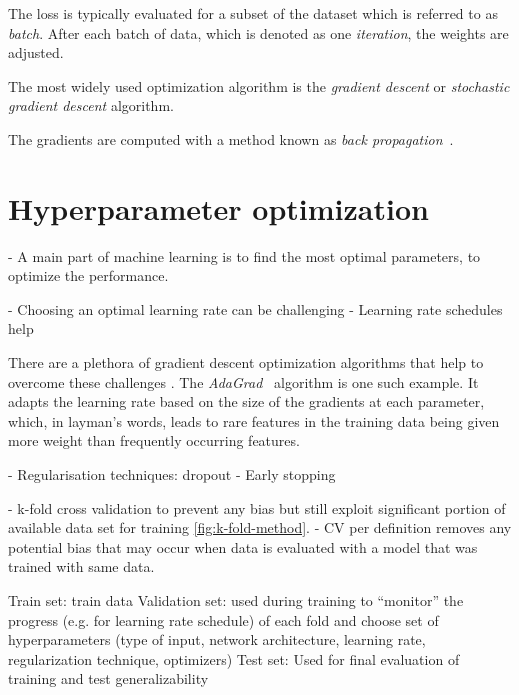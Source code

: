 The loss is typically evaluated for a subset of the dataset which is referred to as \emph{batch}. After each batch of data, which is denoted as one \emph{iteration}, the weights are adjusted.

The most widely used optimization algorithm is the \emph{gradient descent} or \emph{stochastic gradient descent} algorithm. 

The gradients are computed with a method known as \emph{back propagation}~.

\section{Hyperparameter optimization} 
- A main part of machine learning is to find the most optimal parameters, to optimize the performance.

- Choosing an optimal learning rate can be challenging
- Learning rate schedules help


There are a plethora of gradient descent optimization algorithms that help to overcome these challenges . The \emph{AdaGrad}~ algorithm is one such example. It adapts the learning rate based on the size of the gradients at each parameter, which, in layman's words, leads to rare features in the training data being given more weight than frequently occurring features.

- Regularisation techniques: dropout
- Early stopping

- k-fold cross validation to prevent any bias but still exploit significant portion of available data set for training \cref{fig:k-fold-method}.
- CV per definition removes any potential bias that may occur when data is evaluated with a model that was trained with same data.

Train set: train data
Validation set: used during training to ``monitor'' the progress (e.g. for learning rate schedule) of each fold and choose set of hyperparameters (type of input, network architecture, learning rate, regularization technique, optimizers)
Test set: Used for final evaluation of training and test generalizability


